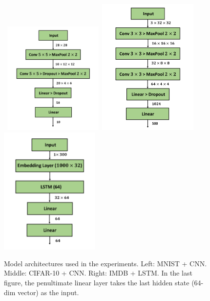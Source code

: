 \documentclass[11pt]{article}
\begin{document}
\vspace{0.2in}
\begin{figure}[H]
    \begin{center}
    \mbox{\hspace{-0.1in}
        \includegraphics[width=1.95in]{plot/mnist_arch.pdf}\hspace{-0.1in}
        \includegraphics[width=1.95in]{plot/cifar_arch.pdf}
        \hspace{-0.1in}
        \includegraphics[width=1.95in]{plot/imdb_arch.pdf}
    }
    \end{center}
	\caption{Model architectures used in the experiments. Left: MNIST + CNN. Middle: CIFAR-10 + CNN. Right: IMDB + LSTM. In the last figure, the penultimate linear layer takes the last hidden state (64-dim vector) as the input.}
	\label{fig:model arch}
\end{figure}
\end{document}
